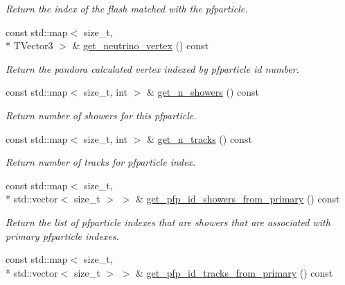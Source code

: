 \begin{DoxyCompactItemize}
\begin{DoxyCompactList}\small\item\em Return the index of the flash matched with the pfparticle. \end{DoxyCompactList}\item 
\hypertarget{group__lee_gac098d39d04f407c9bfc574da4b82fee6}{const std\-::map$<$ size\-\_\-t, \\*
T\-Vector3 $>$ \& \hyperlink{group__lee_gac098d39d04f407c9bfc574da4b82fee6}{get\-\_\-neutrino\-\_\-vertex} () const }\label{group__lee_gac098d39d04f407c9bfc574da4b82fee6}

\begin{DoxyCompactList}\small\item\em Return the pandora calculated vertex indexed by pfparticle id number. \end{DoxyCompactList}\item 
\hypertarget{group__lee_ga43afa7fb8c10333f89774c6d4ea714dc}{const std\-::map$<$ size\-\_\-t, int $>$ \& \hyperlink{group__lee_ga43afa7fb8c10333f89774c6d4ea714dc}{get\-\_\-n\-\_\-showers} () const }\label{group__lee_ga43afa7fb8c10333f89774c6d4ea714dc}

\begin{DoxyCompactList}\small\item\em Return number of showers for this pfparticle. \end{DoxyCompactList}\item 
\hypertarget{group__lee_gad24d64eca5e56d0550572b24d5e213f7}{const std\-::map$<$ size\-\_\-t, int $>$ \& \hyperlink{group__lee_gad24d64eca5e56d0550572b24d5e213f7}{get\-\_\-n\-\_\-tracks} () const }\label{group__lee_gad24d64eca5e56d0550572b24d5e213f7}

\begin{DoxyCompactList}\small\item\em Return number of tracks for pfparticle index. \end{DoxyCompactList}\item 
\hypertarget{group__lee_ga7ea645ce175506b368ceb116bbb77889}{const std\-::map$<$ size\-\_\-t, \\*
std\-::vector$<$ size\-\_\-t $>$ $>$ \& \hyperlink{group__lee_ga7ea645ce175506b368ceb116bbb77889}{get\-\_\-pfp\-\_\-id\-\_\-showers\-\_\-from\-\_\-primary} () const }\label{group__lee_ga7ea645ce175506b368ceb116bbb77889}

\begin{DoxyCompactList}\small\item\em Return the list of pfparticle indexes that are showers that are associated with primary pfparticle indexes. \end{DoxyCompactList}\item 
\hypertarget{group__lee_ga00266c70e046a9ee27e979be75925a09}{const std\-::map$<$ size\-\_\-t, \\*
std\-::vector$<$ size\-\_\-t $>$ $>$ \& \hyperlink{group__lee_ga00266c70e046a9ee27e979be75925a09}{get\-\_\-pfp\-\_\-id\-\_\-tracks\-\_\-from\-\_\-primary} () const }\label{group__lee_ga00266c70e046a9ee27e979be75925a09}


\end{DoxyCompactItemize}
